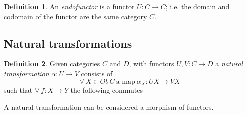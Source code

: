 \documentclass[a4paper,10pt]{article}
\theoremstyle{definition}
\newtheorem{definition}{Definition}[section]
\begin{document}
\begin{definition}
    An \textit{endofunctor} is a functor $U : C \rightarrow C$;
    i.e. the domain and codomain of the functor are the same category $C$.
\end{definition}

\subsection{Natural transformations}
\begin{definition}
    Given categories $C$ and $D$,
    with functors $U, V : C \rightarrow D$
    a \textit{natural transformation} $\alpha : U \rightarrow V$
    consists of
    \begin{equation}
        \forall\ X \in Ob\,C\ \textrm{a map} \ \alpha_X : UX \rightarrow VX
    \end{equation}
    such that $\forall\ f : X \rightarrow Y$ the following commutes
    \begin{center}
    \end{center}
    A natural transformation can be considered a morphism of functors.
\end{definition}
\end{document}
